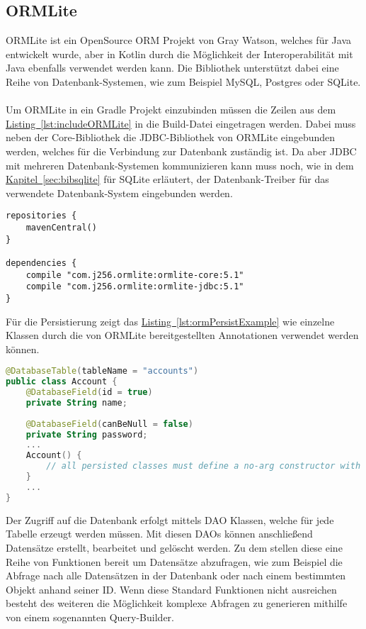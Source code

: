 \subsection{ORMLite}\label{sec:bibormlite}
ORMLite ist ein OpenSource \gls{ORM} Projekt von Gray Watson, welches für Java entwickelt wurde, aber in Kotlin durch die Möglichkeit der Interoperabilität mit Java ebenfalls verwendet werden kann. Die Bibliothek unterstützt dabei eine Reihe von Datenbank-Systemen, wie zum Beispiel MySQL, Postgres oder SQLite.\\
\\
Um ORMLite in ein Gradle Projekt einzubinden müssen die Zeilen aus dem \hyperref[lst:includeORMLite]{Listing~\ref{lst:includeORMLite}} in die Build-Datei eingetragen werden. Dabei muss neben der Core-Bibliothek die \gls{JDBC}-Bibliothek von ORMLite eingebunden werden, welches für die Verbindung zur Datenbank zuständig ist. Da aber \gls{JDBC} mit mehreren Datenbank-Systemen kommunizieren kann muss noch, wie in dem \hyperref[sec:bibsqlite]{Kapitel~\ref{sec:bibsqlite}} für SQLite erläutert, der Datenbank-Treiber für das verwendete Datenbank-System eingebunden werden.
\begin{lstlisting}[style=lstStyleFramed, language=Gradle, caption={Einbindung der Bibliothek ORMLite mithilfe von Gradle}, label=lst:includeORMLite, float]
repositories {
	mavenCentral()
}

dependencies {
	compile "com.j256.ormlite:ormlite-core:5.1"
	compile "com.j256.ormlite:ormlite-jdbc:5.1"
}
\end{lstlisting}
Für die Persistierung zeigt das \hyperref[lst:ormPersistExample]{Listing~\ref{lst:ormPersistExample}} wie einzelne Klassen durch die von ORMLite bereitgestellten Annotationen verwendet werden können.
\begin{lstlisting}[style=lstStyleFramed, language=Kotlin, caption={Beispiel: Persistierung einer Klasse mittels ORMLite \cite{ormlite}},label=lst:ormPersistExample, float]
@DatabaseTable(tableName = "accounts")
public class Account {
	@DatabaseField(id = true)
	private String name;
	
	@DatabaseField(canBeNull = false)
	private String password;
	...
	Account() {
		// all persisted classes must define a no-arg constructor with at least package visibility
	}
	...    
}
\end{lstlisting}
Der Zugriff auf die Datenbank erfolgt mittels \gls{DAO} Klassen, welche für jede Tabelle erzeugt werden müssen. Mit diesen \glspl{DAO} können anschließend Datensätze erstellt, bearbeitet und gelöscht werden. Zu dem stellen diese eine Reihe von Funktionen bereit um Datensätze abzufragen, wie zum Beispiel die Abfrage nach alle Datensätzen in der Datenbank oder nach einem bestimmten Objekt anhand seiner ID. Wenn diese Standard Funktionen nicht ausreichen besteht des weiteren die Möglichkeit komplexe Abfragen zu generieren mithilfe von einem sogenannten Query-Builder.
